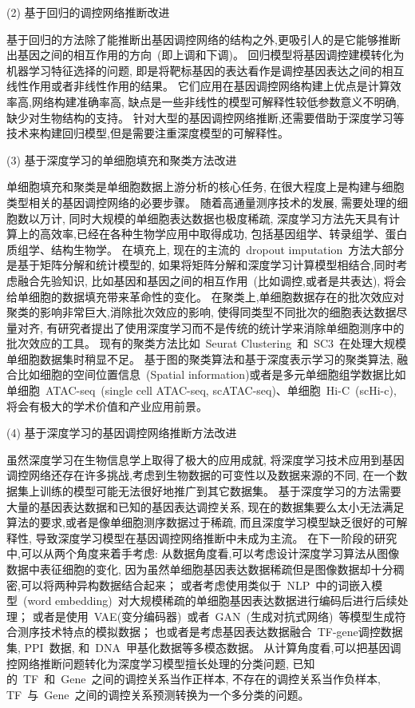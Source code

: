 (2) 基于回归的调控网络推断改进

基于回归的方法除了能推断出基因调控网络的结构之外,更吸引人的是它能够推断出基因之间的相互作用的方向~(即上调和下调)。
回归模型将基因调控建模转化为机器学习特征选择的问题,
即是将靶标基因的表达看作是调控基因表达之间的相互线性作用或者非线性作用的结果。
它们应用在基因调控网络构建上优点是计算效率高,网络构建准确率高,
缺点是一些非线性的模型可解释性较低参数意义不明确,缺少对生物结构的支持。
针对大型的基因调控网络推断,还需要借助于深度学习等技术来构建回归模型,但是需要注重深度模型的可解释性。

(3) 基于深度学习的单细胞填充和聚类方法改进

单细胞填充和聚类是单细胞数据上游分析的核心任务, 
在很大程度上是构建与细胞类型相关的基因调控网络的必要步骤。
随着高通量测序技术的发展, 需要处理的细胞数以万计, 同时大规模的单细胞表达数据也极度稀疏,
深度学习方法先天具有计算上的高效率,已经在各种生物学应用中取得成功,
包括基因组学、转录组学、蛋白质组学、结构生物学。
在填充上, 现在的主流的~dropout imputation~方法大部分是基于矩阵分解和统计模型的,
如果将矩阵分解和深度学习计算模型相结合,同时考虑融合先验知识,
比如基因和基因之间的相互作用~(比如调控,或者是共表达),
将会给单细胞的数据填充带来革命性的变化。
在聚类上,单细胞数据存在的批次效应对聚类的影响非常巨大,消除批次效应的影响,
使得同类型不同批次的细胞表达数据尽量对齐,
有研究者提出了使用深度学习而不是传统的统计学来消除单细胞测序中的批次效应的工具。
现有的聚类方法比如~Seurat Clustering~和~SC3~在处理大规模单细胞数据集时稍显不足。
基于图的聚类算法和基于深度表示学习的聚类算法,
融合比如细胞的空间位置信息~(Spatial information)或者是多元单细胞组学数据比如
单细胞~ATAC-seq~(single cell ATAC-seq, scATAC-seq)、单细胞~Hi-C~(scHi-c), 
将会有极大的学术价值和产业应用前景。

(4) 基于深度学习的基因调控网络推断方法改进

虽然深度学习在生物信息学上取得了极大的应用成就,
将深度学习技术应用到基因调控网络还存在许多挑战,考虑到生物数据的可变性以及数据来源的不同,
在一个数据集上训练的模型可能无法很好地推广到其它数据集。
基于深度学习的方法需要大量的基因表达数据和已知的基因表达调控关系,
现在的数据集要么太小无法满足算法的要求,或者是像单细胞测序数据过于稀疏,
而且深度学习模型缺乏很好的可解释性,
导致深度学习模型在基因调控网络推断中未成为主流。
在下一阶段的研究中,可以从两个角度来着手考虑:
从数据角度看,可以考虑设计深度学习算法从图像数据中表征细胞的变化,
因为虽然单细胞基因表达数据稀疏但是图像数据却十分稠密,可以将两种异构数据结合起来；
或者考虑使用类似于~NLP~中的词嵌入模型~(word embedding)~对大规模稀疏的单细胞基因表达数据进行编码后进行后续处理；
或者是使用~VAE(变分编码器)~或者~GAN~(生成对抗式网络)~等模型生成符合测序技术特点的模拟数据；
也或者是考虑基因表达数据融合~TF-gene调控数据集, PPI~数据, 和~DNA~甲基化数据等多模态数据。
从计算角度看,可以把基因调控网络推断问题转化为深度学习模型擅长处理的分类问题, 
已知的~TF~和~Gene~之间的调控关系当作正样本, 不存在的调控关系当作负样本,
TF~与~Gene~之间的调控关系预测转换为一个多分类的问题。